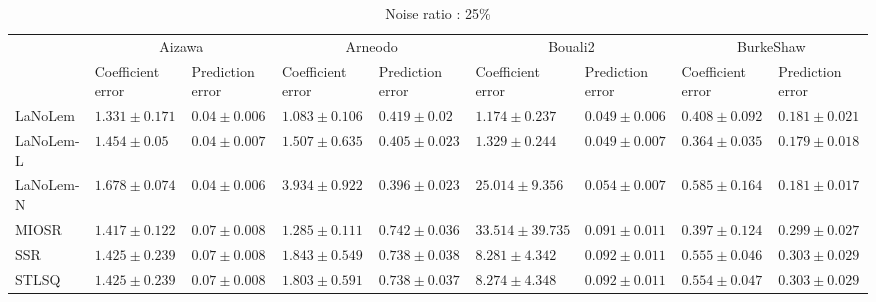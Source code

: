 \begin{table*}
\centering
\caption{Noise ratio : 25\%}
\label{}
\scalebox{0.7}
{
\begin{tabular}{lllllllll}
\toprule
 & \multicolumn{2}{c}{Aizawa} & \multicolumn{2}{c}{Arneodo} & \multicolumn{2}{c}{Bouali2} & \multicolumn{2}{c}{BurkeShaw} \\
 & Coefficient error & Prediction error & Coefficient error & Prediction error & Coefficient error & Prediction error & Coefficient error & Prediction error \\
\midrule
LaNoLem & $\mathbf{1.331}\pm 0.171$ & $0.04\pm 0.006$ & $\mathbf{1.083}\pm 0.106$ & $0.419\pm 0.02$ & $\mathbf{1.174}\pm 0.237$ & $0.049\pm 0.006$ & $0.408\pm 0.092$ & $0.181\pm 0.021$ \\
LaNoLem-L & $1.454\pm 0.05$ & $\mathbf{0.04}\pm 0.007$ & $1.507\pm 0.635$ & $0.405\pm 0.023$ & $1.329\pm 0.244$ & $\mathbf{0.049}\pm 0.007$ & $\mathbf{0.364}\pm 0.035$ & $\mathbf{0.179}\pm 0.018$ \\
LaNoLem-N & $1.678\pm 0.074$ & $0.04\pm 0.006$ & $3.934\pm 0.922$ & $\mathbf{0.396}\pm 0.023$ & $25.014\pm 9.356$ & $0.054\pm 0.007$ & $0.585\pm 0.164$ & $0.181\pm 0.017$ \\
MIOSR & $1.417\pm 0.122$ & $0.07\pm 0.008$ & $1.285\pm 0.111$ & $0.742\pm 0.036$ & $33.514\pm 39.735$ & $0.091\pm 0.011$ & $0.397\pm 0.124$ & $0.299\pm 0.027$ \\
SSR & $1.425\pm 0.239$ & $0.07\pm 0.008$ & $1.843\pm 0.549$ & $0.738\pm 0.038$ & $8.281\pm 4.342$ & $0.092\pm 0.011$ & $0.555\pm 0.046$ & $0.303\pm 0.029$ \\
STLSQ & $1.425\pm 0.239$ & $0.07\pm 0.008$ & $1.803\pm 0.591$ & $0.738\pm 0.037$ & $8.274\pm 4.348$ & $0.092\pm 0.011$ & $0.554\pm 0.047$ & $0.303\pm 0.029$ \\

\midrule


\end{tabular}}
\end{table*}
